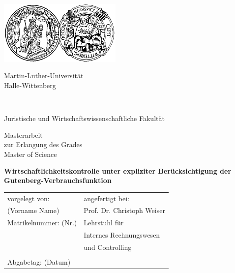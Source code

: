 \begin{center}
    \includegraphics[width=6cm]{mlu_logo.jpg} %
    \vspace*{-1cm}
    \begin{spacing}{1.75}
        \begin{huge}
            Martin-Luther-Universität\\
            Halle-Wittenberg
        \end{huge}\\
        \vspace*{-0.2cm}
        \begin{Large}
            Juristische und Wirtschaftswissenschaftliche Fakultät
        \end{Large}
    \end{spacing}
    \vspace*{2cm}
    \begin{spacing}{0.95}
        \begin{Large}
            Masterarbeit\\
            zur Erlangung des Grades\\
            Master of Science\\
        \end{Large}
    \end{spacing}
    \vspace*{2cm}
    \begin{spacing}{1.6}
        \begin{LARGE}
            \textbf{Wirtschaftlichkeitskontrolle unter expliziter Berücksichtigung der Gutenberg-Verbrauchsfunktion}
        \end{LARGE}
    \end{spacing}
    \vspace*{2cm}
    \begin{table}[htbp]
        \centering
        \begin{tabular}{p{9.25cm}p{4.68cm}}
            vorgelegt von:        & angefertigt bei:           \\
            (Vorname Name)        & Prof. Dr. Christoph Weiser \\
            Matrikelnummer: (Nr.) & Lehrstuhl für              \\
                                  & Internes Rechnungswesen    \\
                                  & und Controlling            \\
                                  &                            \\
            Abgabetag: (Datum)    &                            \\
        \end{tabular}
    \end{table}
\end{center}
